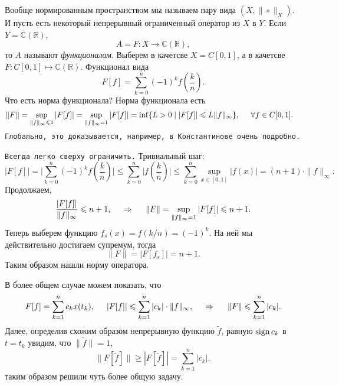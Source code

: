 Вообще нормированным пространством мы называем пару вида $(X, \|\circ\|_X)$. И пусть есть некоторый непрерывный ограниченный оператор из $X$ в $Y$. Если $Y = \mathbb{C}(\mathbb{R})$, 
\begin{equation*}
    A = F \colon  X \to \mathbb{C}(\mathbb{R}),
\end{equation*}
то  $A$ называют \textit{функционалом}. Выберем в качетсве $X = C[0, 1]$, а в качетсве $F \colon C[0, 1] \mapsto \mathbb{C}(\mathbb{R})$.
Функционал вида
\begin{equation*}
    F[f] = \sum_{k=0}^{n}(-1)^k f\left(\frac{k}{n}\right).
\end{equation*}
Что есть норма функционала? Норма функционала есть
\begin{align*}
    \|F\| 
    &= \sup_{\|f\|_{\infty} \leq 1} |F[f]|  
    = \sup_{\|f\|_{\infty} = 1} |F[f]| 
    = \inf \{
        L > 0 \mid |F[f]| \leq L\|f\|_\infty
    \}, 
    \hspace{5 mm} \forall f \in C[0, 1].
\end{align*}
\texttt{Глобально, это доказывается, например, в Константинове очень подробно.} 

\texttt{Всегда легко сверху ограничить.} Тривиальный шаг:
\begin{equation*}
    |F[f]| = \bigg|
        \sum_{k=0}^{n} (-1)^k f\left(
            \frac{k}{n}
        \right)
    \bigg| \leq \sum_{k=0}^{n} \bigg|
        f\left(\frac{k}{n}\right)
    \bigg| \leq \sum_{k=0}^{n} \sup_{x \in [0,1 ]} |f(x)| = (n+1) \cdot \|f\|_{\infty}.
\end{equation*}
Продолжаем, 
\begin{equation*}
    \frac{|F[f]|}{\|f\|_{\infty}} \leq n + 1,
    \hspace{0.5cm} \Rightarrow \hspace{0.5cm}
    \|F\| = \sup_{\|f\|_{\infty} = 1} |F[f]| \leq n+1.
\end{equation*}
Теперь выберем функцию $f_s(x) = f(k/n) = (-1)^k$. На ней мы действительно достигаем супремум, тогда
\begin{equation*}
    \|F\| = |F[f_s]| = n+1.
\end{equation*}
Таким образом нашли норму оператора. 

В более общем случае можем показать, что
\begin{equation*}
F[f] = \sum_{k=1}^{n}  c_k x(t_k),
\hspace{5 mm} 
    |F[f]| \leq \sum_{k=1}^{n} |c_k| \cdot \|f\|_{\infty},
    \hspace{0.5cm} \Rightarrow \hspace{0.5cm}
    \|F\| \leq \sum_{k=1}^{n} |c_k|.
\end{equation*}
Далее, определив схожим образом непрерывную функцию $\tilde{f}$, равную $\sign c_k$ в $t=t_k$ увидим, что $\|\tilde{f}\|=1$, 
\begin{equation*}
    \|F[\tilde{f}]\| \geq |F[\tilde{f}]| = \sum_{k=1}^{n}  |c_k|,
\end{equation*}
таким образом решили чуть более общую задачу. 






